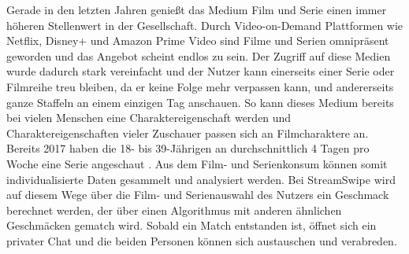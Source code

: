Gerade in den letzten Jahren genießt das Medium Film und Serie einen immer höheren Stellenwert in der Gesellschaft. Durch Video-on-Demand Plattformen wie Netflix, Disney+ und Amazon Prime Video  sind Filme und Serien omnipräsent geworden und das Angebot scheint endlos zu sein. Der Zugriff auf diese Medien wurde dadurch stark vereinfacht und der Nutzer kann einerseits einer Serie oder Filmreihe treu bleiben, da er keine Folge mehr verpassen kann, und andererseits ganze Staffeln an einem einzigen Tag anschauen. So kann dieses Medium bereits bei vielen Menschen eine Charaktereigenschaft werden und Charaktereigenschaften vieler Zuschauer passen sich an Filmcharaktere an.\\
Bereits 2017 haben die 18- bis 39-Jährigen an durchschnittlich 4 Tagen pro Woche eine Serie angeschaut \cite{serienkonsum}. Aus dem Film- und Serienkonsum können somit individualisierte Daten gesammelt und analysiert werden. Bei StreamSwipe wird auf diesem Wege über die Film- und Serienauswahl des Nutzers ein Geschmack berechnet werden, der über einen Algorithmus mit anderen ähnlichen Geschmäcken gematch wird. Sobald ein Match entstanden ist, öffnet sich ein privater Chat und die beiden Personen können sich austauschen und verabreden.